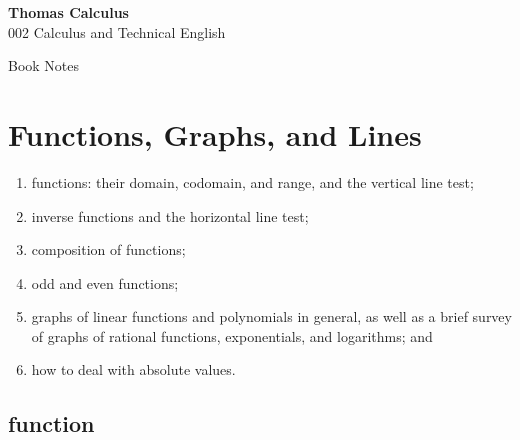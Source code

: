 \documentclass{book}
\begin{document}
 \begin{titlepage}
 \color{darkgray} 
 \begingroup
 \thispagestyle{empty}
 \centering
 \vspace*{5cm}
 \par\normalfont\fontsize{35}{35}\sffamily\selectfont
 \textbf{Thomas Calculus}\\ 
 {\LARGE 002 Calculus and Technical English}\par %
 \vspace*{1cm}
 {\Huge Book Notes}\par %
 \endgroup
 \end{titlepage}



 \section{Functions, Graphs, and Lines}


\par \begin{enumerate}
 \item functions: their domain, codomain, and range, and the vertical line test;
 \item inverse functions and the horizontal line test;
 \item composition of functions;
 \item odd and even functions;
 \item graphs of linear functions and polynomials in general, as well as a brief
 survey of graphs of rational functions, exponentials, and logarithms; and
 \item how to deal with absolute values.

\end{enumerate}
 \color{darkgray}
 \begin{shaded}
 {\subsection[short]{function}}
\end{shaded}
\color{black}
\end{document}
